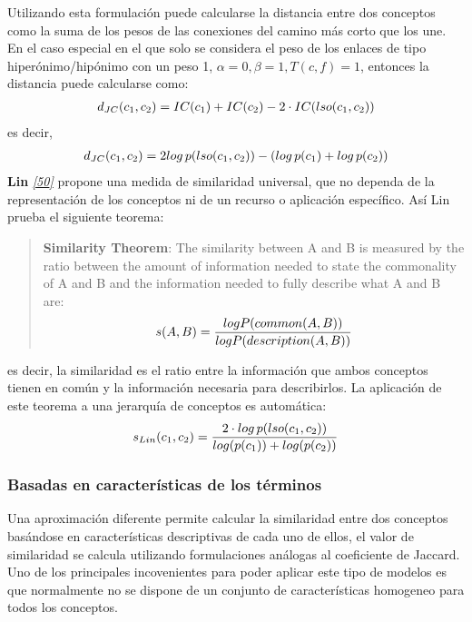 \documentclass[a4paper,12pt,spanish]{book}
\begin{document}
Utilizando esta formulación puede calcularse la distancia entre dos conceptos como la suma de los
pesos de las conexiones del camino más corto que los une. En el caso especial en el que solo se
considera el peso de los enlaces de tipo hiperónimo/hipónimo con un peso 1,
\(\alpha = 0, \beta = 1, T(c,f)=1\), entonces la distancia puede calcularse como:
\begin{gather}
\begin{split}d_{JC}(c_1, c_2) = IC(c_1) + IC(c_2) - 2 \cdot IC(lso(c_1, c_2))\end{split}\notag
\end{gather}
es decir,
\begin{gather}
\begin{split}d_{JC}(c_1, c_2) = 2log\, p(lso(c_1, c_2)) - (log \, p(c_1) + log \, p(c_2))\end{split}\notag
\end{gather}
\textbf{Lin} \label{1.state-of-the-art/ii.medidas-distancia:id48}{\hyperref[zreferences:lin1998]{\emph{{[}50{]}}}} propone una medida de similaridad universal, que no dependa de la
representación de los conceptos ni de un recurso o aplicación específico. Así Lin prueba
el siguiente teorema:
\begin{quote}

\textbf{Similarity Theorem}: The similarity between A and B is measured by the ratio between the
amount of information needed to state the commonality of A and B and the information
needed to fully describe what A and B are:
\begin{gather}
\begin{split}s(A, B) = \frac{log P(common(A, B))}{log P(description(A,B))}\end{split}\notag
\end{gather}\end{quote}

es decir, la similaridad es el ratio entre la información que ambos conceptos tienen en común
y la información necesaria para describirlos. La aplicación de este teorema a una jerarquía
de conceptos es automática:
\begin{gather}
\begin{split}s_{Lin}(c_1, c_2) = \frac{2 \cdot log \, p(lso(c_1, c_2))}{log(p(c_1)) + log(p(c_2))}\end{split}\notag
\end{gather}

\subsubsection{Basadas en características de los términos}
\label{1.state-of-the-art/ii.medidas-distancia:basadas-en-caracteristicas-de-los-terminos}
Una aproximación diferente permite calcular la similaridad entre dos conceptos basándose en
características descriptivas de cada uno de ellos, el valor de similaridad se calcula
utilizando formulaciones análogas al coeficiente de Jaccard.
Uno de los principales incovenientes para poder aplicar este tipo de modelos es que normalmente
no se dispone de un conjunto de características homogeneo para todos los conceptos.
\end{document}
